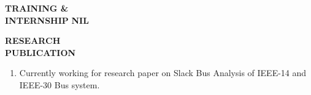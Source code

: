 \documentclass{article}
\begin{document}
	 \begin{flushleft} 
	 	\vspace{0.4in}
	 	\textbf{TRAINING \& \\ INTERNSHIP}
	 	\hspace{1.5cm} \textbf{NIL}
	 \end{flushleft}
	 
	  \begin{flushleft} 
	  	\vspace{0.4in}
	  	\textbf{RESEARCH \\ PUBLICATION}
	  	\begin{enumerate}
	  		\vspace{-0.45in}
	  		\addtolength{\itemindent}{1.359in}
	  		\item  Currently working for research paper on Slack Bus Analysis of IEEE-14 and\\\hspace{3.4cm} IEEE-30 Bus system.
	  	\end{enumerate}
	  \end{flushleft}
	  
\end{document}
